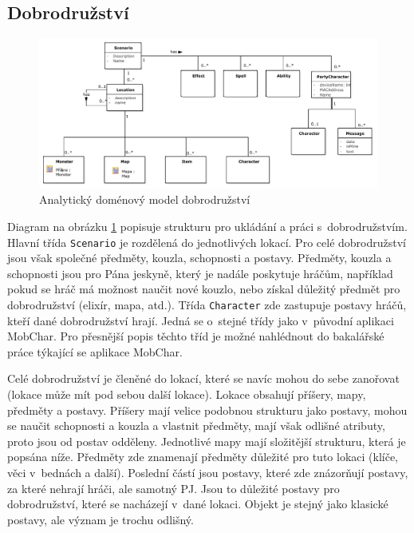 \documentclass[thesis=B,czech]{resources/FITthesis}[2012/06/26]
\begin{document}
\subsection{Dobrodružství}
\begin{figure}\centering
	\includegraphics[width=1\textwidth]{images/domain_scenario}
	\caption[Analytický doménový model dobrodružství]{Analytický doménový model dobrodružství}\label{fig:dm_scenario}
\end{figure}
Diagram na obrázku \ref{fig:dm_scenario} popisuje strukturu pro ukládání a práci s~dobrodružstvím. Hlavní třída \texttt{Scenario} je rozdělená do jednotlivých lokací. Pro celé dobrodružství jsou však společné předměty, kouzla, schopnosti a postavy. Předměty, kouzla a schopnosti jsou pro Pána jeskyně, který je nadále poskytuje hráčům, například pokud se hráč má možnost naučit nové kouzlo, nebo získal důležitý předmět pro dobrodružství (elixír, mapa, atd.). Třída \texttt{Character} zde zastupuje postavy hráčů, kteří dané dobrodružství hrají. Jedná se o~stejné třídy jako v~původní aplikaci MobChar. Pro přesnější popis těchto tříd je možné nahlédnout do bakalářské práce týkající se aplikace MobChar\cite{Weberova_2017}.\par

Celé dobrodružství je členěné do lokací, které se navíc mohou do sebe zanořovat (lokace může mít pod sebou další lokace). Lokace obsahují příšery, mapy, předměty a postavy. Příšery mají velice podobnou strukturu jako postavy, mohou se naučit schopnosti a kouzla a vlastnit předměty, mají však odlišné atributy, proto jsou od postav odděleny. Jednotlivé mapy mají složitější strukturu, která je popsána níže. Předměty zde znamenají předměty důležité pro tuto lokaci (klíče, věci v~bednách a další). Poslední částí jsou postavy, které zde znázorňují postavy, za které nehrají hráči, ale samotný PJ. Jsou to důležité postavy pro dobrodružství, které se nacházejí v~dané lokaci. Objekt je stejný jako klasické postavy, ale význam je trochu odlišný.
\end{document}
